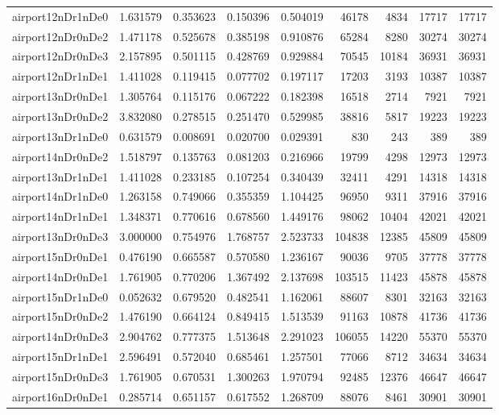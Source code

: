 \begin{longtable}{|l|r|r|r|r|r|r|r|r|}
airport12nDr1nDe0 & 1.631579 & 0.353623 & 0.150396 & 0.504019 & 46178 & 4834 & 17717 & 17717 \\
airport12nDr0nDe2 & 1.471178 & 0.525678 & 0.385198 & 0.910876 & 65284 & 8280 & 30274 & 30274 \\
airport12nDr0nDe3 & 2.157895 & 0.501115 & 0.428769 & 0.929884 & 70545 & 10184 & 36931 & 36931 \\
airport12nDr1nDe1 & 1.411028 & 0.119415 & 0.077702 & 0.197117 & 17203 & 3193 & 10387 & 10387 \\
airport13nDr0nDe1 & 1.305764 & 0.115176 & 0.067222 & 0.182398 & 16518 & 2714 & 7921 & 7921 \\
airport13nDr0nDe2 & 3.832080 & 0.278515 & 0.251470 & 0.529985 & 38816 & 5817 & 19223 & 19223 \\
airport13nDr1nDe0 & 0.631579 & 0.008691 & 0.020700 & 0.029391 & 830 & 243 & 389 & 389 \\
airport14nDr0nDe2 & 1.518797 & 0.135763 & 0.081203 & 0.216966 & 19799 & 4298 & 12973 & 12973 \\
airport13nDr1nDe1 & 1.411028 & 0.233185 & 0.107254 & 0.340439 & 32411 & 4291 & 14318 & 14318 \\
airport14nDr1nDe0 & 1.263158 & 0.749066 & 0.355359 & 1.104425 & 96950 & 9311 & 37916 & 37916 \\
airport14nDr1nDe1 & 1.348371 & 0.770616 & 0.678560 & 1.449176 & 98062 & 10404 & 42021 & 42021 \\
airport13nDr0nDe3 & 3.000000 & 0.754976 & 1.768757 & 2.523733 & 104838 & 12385 & 45809 & 45809 \\
airport15nDr0nDe1 & 0.476190 & 0.665587 & 0.570580 & 1.236167 & 90036 & 9705 & 37778 & 37778 \\
airport14nDr0nDe1 & 1.761905 & 0.770206 & 1.367492 & 2.137698 & 103515 & 11423 & 45878 & 45878 \\
airport15nDr1nDe0 & 0.052632 & 0.679520 & 0.482541 & 1.162061 & 88607 & 8301 & 32163 & 32163 \\
airport15nDr0nDe2 & 1.476190 & 0.664124 & 0.849415 & 1.513539 & 91163 & 10878 & 41736 & 41736 \\
airport14nDr0nDe3 & 2.904762 & 0.777375 & 1.513648 & 2.291023 & 106055 & 14220 & 55370 & 55370 \\
airport15nDr1nDe1 & 2.596491 & 0.572040 & 0.685461 & 1.257501 & 77066 & 8712 & 34634 & 34634 \\
airport15nDr0nDe3 & 1.761905 & 0.670531 & 1.300263 & 1.970794 & 92485 & 12376 & 46647 & 46647 \\
airport16nDr0nDe1 & 0.285714 & 0.651157 & 0.617552 & 1.268709 & 88076 & 8461 & 30901 & 30901 \\

\end{longtable}
